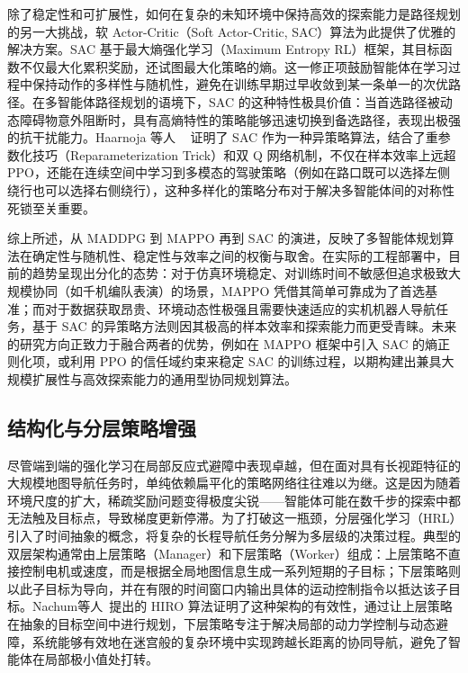 \documentclass[13.5pt]{extarticle}
\begin{document}
除了稳定性和可扩展性，如何在复杂的未知环境中保持高效的探索能力是路径规划的另一大挑战，软 Actor-Critic（Soft Actor-Critic, SAC）算法为此提供了优雅的解决方案。SAC 基于最大熵强化学习（Maximum Entropy RL）框架，其目标函数不仅最大化累积奖励，还试图最大化策略的熵。这一修正项鼓励智能体在学习过程中保持动作的多样性与随机性，避免在训练早期过早收敛到某一条单一的次优路径。在多智能体路径规划的语境下，SAC 的这种特性极具价值：当首选路径被动态障碍物意外阻断时，具有高熵特性的策略能够迅速切换到备选路径，表现出极强的抗干扰能力。Haarnoja 等人 ~\cite{haarnoja2018soft} 证明了 SAC 作为一种异策略算法，结合了重参数化技巧（Reparameterization Trick）和双 Q 网络机制，不仅在样本效率上远超 PPO，还能在连续空间中学习到多模态的驾驶策略（例如在路口既可以选择左侧绕行也可以选择右侧绕行），这种多样化的策略分布对于解决多智能体间的对称性死锁至关重要。

综上所述，从 MADDPG 到 MAPPO 再到 SAC 的演进，反映了多智能体规划算法在确定性与随机性、稳定性与效率之间的权衡与取舍。在实际的工程部署中，目前的趋势呈现出分化的态势：对于仿真环境稳定、对训练时间不敏感但追求极致大规模协同（如千机编队表演）的场景，MAPPO 凭借其简单可靠成为了首选基准；而对于数据获取昂贵、环境动态性极强且需要快速适应的实机机器人导航任务，基于 SAC 的异策略方法则因其极高的样本效率和探索能力而更受青睐。未来的研究方向正致力于融合两者的优势，例如在 MAPPO 框架中引入 SAC 的熵正则化项，或利用 PPO 的信任域约束来稳定 SAC 的训练过程，以期构建出兼具大规模扩展性与高效探索能力的通用型协同规划算法。

\subsection{结构化与分层策略增强}

尽管端到端的强化学习在局部反应式避障中表现卓越，但在面对具有长视距特征的大规模地图导航任务时，单纯依赖扁平化的策略网络往往难以为继。这是因为随着环境尺度的扩大，稀疏奖励问题变得极度尖锐——智能体可能在数千步的探索中都无法触及目标点，导致梯度更新停滞。为了打破这一瓶颈，分层强化学习（HRL）引入了时间抽象的概念，将复杂的长程导航任务分解为多层级的决策过程。典型的双层架构通常由上层策略（Manager）和下层策略（Worker）组成：上层策略不直接控制电机或速度，而是根据全局地图信息生成一系列短期的子目标；下层策略则以此子目标为导向，并在有限的时间窗口内输出具体的运动控制指令以抵达该子目标。Nachum等人~\cite{nachum2018data}提出的 HIRO 算法证明了这种架构的有效性，通过让上层策略在抽象的目标空间中进行规划，下层策略专注于解决局部的动力学控制与动态避障，系统能够有效地在迷宫般的复杂环境中实现跨越长距离的协同导航，避免了智能体在局部极小值处打转。
\end{document}
